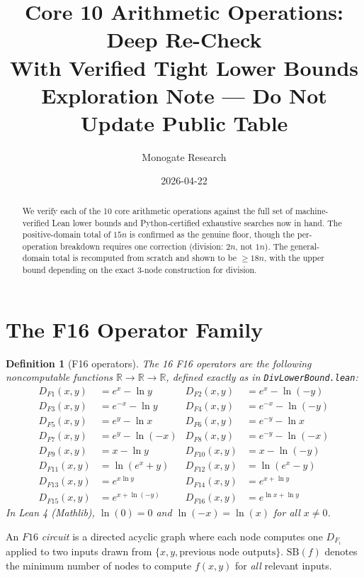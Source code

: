 \documentclass[11pt]{article}
\title{Core 10 Arithmetic Operations: Deep Re-Check\\
With Verified Tight Lower Bounds\\
\large Exploration Note --- Do Not Update Public Table}
\author{Monogate Research}
\date{2026-04-22}
\newtheorem{definition}[theorem]{Definition}
\begin{document}
\maketitle

\begin{abstract}
We verify each of the 10 core arithmetic operations against the full set of
machine-verified Lean lower bounds and Python-certified exhaustive searches now in hand.
The positive-domain total of $15n$ is confirmed as the genuine floor, though
the per-operation breakdown requires one correction (division: $2n$, not $1n$).
The general-domain total is recomputed from scratch and shown to be $\geq 18n$,
with the upper bound depending on the exact 3-node construction for division.
\end{abstract}

\section{The F16 Operator Family}

\begin{definition}[F16 operators]
The 16 F16 operators are the following noncomputable functions $\mathbb{R} \to \mathbb{R} \to \mathbb{R}$,
defined exactly as in \texttt{DivLowerBound.lean}:
\begin{align*}
D_{F1}(x,y)  &= e^x - \ln y       & D_{F2}(x,y)  &= e^x - \ln(-y) \\
D_{F3}(x,y)  &= e^{-x} - \ln y    & D_{F4}(x,y)  &= e^{-x} - \ln(-y) \\
D_{F5}(x,y)  &= e^y - \ln x       & D_{F6}(x,y)  &= e^{-y} - \ln x \\
D_{F7}(x,y)  &= e^y - \ln(-x)     & D_{F8}(x,y)  &= e^{-y} - \ln(-x) \\
D_{F9}(x,y)  &= x - \ln y         & D_{F10}(x,y) &= x - \ln(-y) \\
D_{F11}(x,y) &= \ln(e^x + y)      & D_{F12}(x,y) &= \ln(e^x - y) \\
D_{F13}(x,y) &= e^{x \ln y}       & D_{F14}(x,y) &= e^{x + \ln y} \\
D_{F15}(x,y) &= e^{x + \ln(-y)}   & D_{F16}(x,y) &= e^{\ln x + \ln y}
\end{align*}
\noindent In Lean 4 (Mathlib), $\ln(0) = 0$ and $\ln(-x) = \ln(x)$ for all $x \neq 0$.
\end{definition}

\noindent An $F16$ \emph{circuit} is a directed acyclic graph where each node computes
one $D_{F_i}$ applied to two inputs drawn from $\{x, y, \text{previous node outputs}\}$.
$\mathrm{SB}(f)$ denotes the minimum number of nodes to compute $f(x,y)$ for \emph{all}
relevant inputs.
\end{document}
